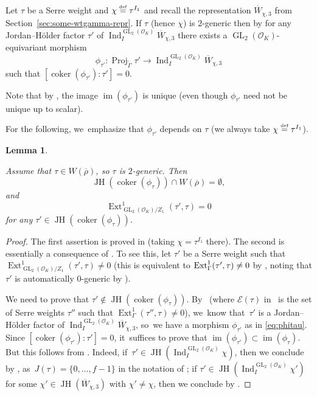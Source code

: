 \documentclass[JEP,XML,SOM,Unicode,NoFloatCountersInSection, NoEqCountersInSection,published]{cedram}
\let\wt\widetilde
\newcommand{\defeq}{\stackrel{\textrm{\tiny{\upshape{def}}}}{=}}
\newcommand{\cO}{\mathcal{O}}
\newcommand{\brho}{\overline{\rho}}
\DeclareMathOperator{\coker}{coker}
\DeclareMathOperator{\Ext}{Ext}
\DeclareMathOperator{\GL}{GL}
\DeclareMathOperator{\im}{im}
\DeclareMathOperator{\Ind}{Ind}
\DeclareMathOperator{\JH}{\mathrm{JH}}
\DeclareMathOperator{\Proj}{Proj}
\theoremstyle{plain}
\newtheorem{lem}[prop]{Lemma}
\theoremstyle{definition}
\begin{document}
Let $\tau$ be a Serre weight and $\chi\defeq \tau^{I_1}$ and recall the representation $\overline{W}_{\chi,3}$ from Section~\ref{sec:some-wtgamma-repr}. {
If $\tau$ (hence $\chi$) is $2$-generic then}
by \cite[Prop.\,3.10(i)]{HuWang2} for any
Jordan--Hölder factor $\tau'$ of $\Ind_I^{\GL_2(\cO_K)}\overline{W}_{\chi,3}$ there exists a $\GL_2(\cO_K)$-equivariant morphism
\begin{equation}\label{eq:phitau}
\phi_{\tau'}: \Proj_{\wt{\Gamma}}\tau'\to \Ind_I^{\GL_2(\cO_K)}\overline{W}_{\chi,3}
\end{equation}
such that $[\coker(\phi_{\tau'}):\tau']=0$.

Note that by \cite[Prop.\,3.10(ii)]{HuWang2}, the image $\im(\phi_{\tau'})$ is unique (even though $\phi_{\tau'}$ need not be unique up to scalar).

For the following, we~emphasize that $\phi_{\tau'}$ depends on $\tau$ (we always take $\chi \defeq \tau^{I_1}$).

\begin{lem}\label{lem:coker}

Assume that $\tau\in W(\brho)$, {so $\tau$ is $2$-generic}. Then
\[
\JH(\coker(\phi_{\tau}))\cap W(\brho)=\emptyset,
\]
and
\[
\Ext^1_{\GL_2(\cO_K)/Z_1}(\tau',\tau)=0
\]
for any $\tau'\in \JH(\coker(\phi_{\tau}))$.
\end{lem}

\begin{proof}
The first assertion is proved in \cite[Cor.\,4.14]{HuWang2} {(taking $\chi = \tau^{I_1}$ there)}. The second is essentially a consequence of \cite[Cor.\,3.11]{HuWang2}. To see this, let $\tau'$ be a
Serre weight such that $\Ext^1_{\GL_2(\cO_K)/Z_1}(\tau',\tau)\neq 0$ (this is equivalent to $\Ext^1_{\Gamma}(\tau',\tau)\neq\nobreak 0$ by \cite[Lem.\,4.3.4]{BHHMS4}, {noting that $\tau'$ is automatically $0$-generic by \cite[Cor.\,5.6(ii)]{BP}}).

We need to prove that $\tau'\notin \JH(\coker(\phi_{\tau}))$. By~\cite[Prop.\,3.12(ii)]{HuWang2} (where $\mathscr{E}(\tau)$ in \loccit\ is the set of Serre weights $\tau''$ such that $\Ext^1_{\Gamma}(\tau'',\tau)\neq0$), we~know that~$\tau'$ is a Jordan--Hölder factor of $\Ind_I^{\GL_2(\cO_K)}\overline{W}_{\chi,3}$, so~we have a morphism $\phi_{\tau'}$ as in \eqref{eq:phitau}. Since $[\coker(\phi_{\tau'}):\tau']=0$, it~suffices to prove that $\im(\phi_{\tau'})\subset \im(\phi_{\tau})$. But this follows from \cite[Cor.\,3.11(a), (c)]{HuWang2}. Indeed, if~$\tau'\in \JH(\Ind_I^{\GL_2(\cO_K)}\chi)$, then we conclude by \cite[Cor.\,3.11(a)]{HuWang2}, as~$J(\tau)=\{0,\dots,f-1\}$ in the notation of \loccit; if $\tau'\in \JH(\Ind_I^{\GL_2(\cO_K)}\chi')$ for some $\chi'\in \JH(\overline{W}_{\chi,3})$ with $\chi'\neq \chi$, then we conclude by \cite[Cor.\,3.11(c)]{HuWang2}.
\end{proof}
\end{document}

